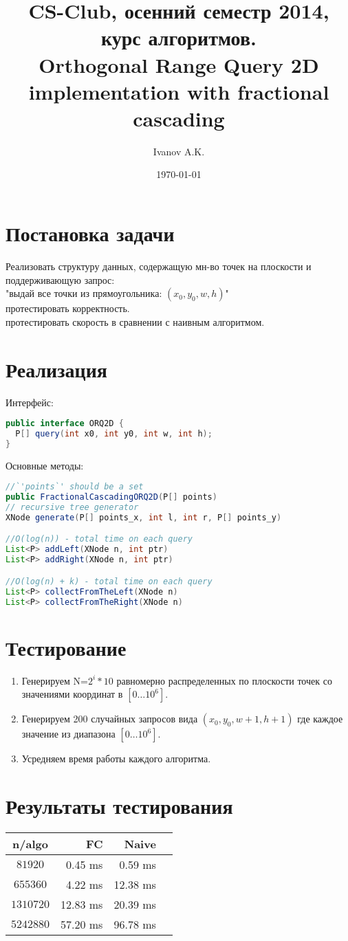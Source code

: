 \documentclass[a4paper,12pt]{article}
\title{CS-Club, осенний семестр 2014, курс алгоритмов. \\Orthogonal Range Query 2D implementation with fractional cascading}
\author{Ivanov A.K.}
\date{\today}
\begin{document}
\maketitle

\section{Постановка задачи}
Реализовать структуру данных, содержащую мн-во точек на плоскости и поддерживающую запрос:
\\"выдай все точки из прямоугольника: $(x_0, y_0, w, h)$"
\\протестировать корректность.
\\протестировать скорость в сравнении с наивным алгоритмом.

\section{Реализация}
Интерфейс:
\begin{lstlisting}[language=java]
public interface ORQ2D {
  P[] query(int x0, int y0, int w, int h);
}
\end{lstlisting}
Основные методы:
\begin{lstlisting}[language=java]
//`'points`' should be a set
public FractionalCascadingORQ2D(P[] points) 
// recursive tree generator
XNode generate(P[] points_x, int l, int r, P[] points_y) 

//O(log(n)) - total time on each query
List<P> addLeft(XNode n, int ptr)
List<P> addRight(XNode n, int ptr)

//O(log(n) + k) - total time on each query
List<P> collectFromTheLeft(XNode n)
List<P> collectFromTheRight(XNode n)
\end{lstlisting}
\section{Тестирование}
\begin{enumerate}
\item Генерируем N=$2^i*10$ равномерно распределенных по плоскости точек со значениями координат в  $[0\dots10^6]$.
\item Генерируем 200 случайных запросов вида $(x_0, y_0, w + 1, h + 1)$ где каждое значение из диапазона $[0\dots10^6]$.
\item Усредняем время работы каждого алгоритма.
\end{enumerate}

\section{Результаты тестирования}

\vspace{1em}
\begin{tabular}{|c|r|r|r|}
\hline
n/algo & FC & Naive \\
\hline
$81920$ & 0.45 ms & 0.59 ms \\
\hline
$655360$ & 4.22 ms & 12.38 ms \\
\hline
$1310720$ & 12.83 ms & 20.39 ms \\
\hline
$5242880$ & 57.20 ms & 96.78 ms \\
\hline
\end{tabular}
\end{document}
